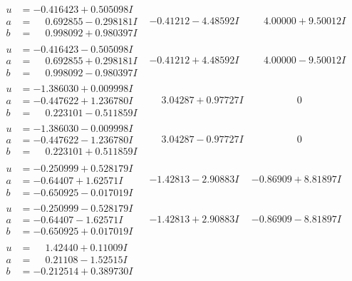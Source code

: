 \documentclass[1p]{elsarticle_modified}
\theoremstyle{definition}
\begin{document}
$$\begin{array}{c|c|c}
 \hline 
\begin{aligned}
u &= -0.416423 + 0.505098 I \\
a &= \phantom{-}0.692855 - 0.298181 I \\
b &= \phantom{-}0.998092 + 0.980397 I\end{aligned}
 & -0.41212 - 4.48592 I & \phantom{-}4.00000 + 9.50012 I \\ \hline\begin{aligned}
u &= -0.416423 - 0.505098 I \\
a &= \phantom{-}0.692855 + 0.298181 I \\
b &= \phantom{-}0.998092 - 0.980397 I\end{aligned}
 & -0.41212 + 4.48592 I & \phantom{-}4.00000 - 9.50012 I \\ \hline\begin{aligned}
u &= -1.386030 + 0.009998 I \\
a &= -0.447622 + 1.236780 I \\
b &= \phantom{-}0.223101 - 0.511859 I\end{aligned}
 & \phantom{-}3.04287 + 0.97727 I & \phantom{-0.000000 } 0 \\ \hline\begin{aligned}
u &= -1.386030 - 0.009998 I \\
a &= -0.447622 - 1.236780 I \\
b &= \phantom{-}0.223101 + 0.511859 I\end{aligned}
 & \phantom{-}3.04287 - 0.97727 I & \phantom{-0.000000 } 0 \\ \hline\begin{aligned}
u &= -0.250999 + 0.528179 I \\
a &= -0.64407 + 1.62571 I \\
b &= -0.650925 - 0.017019 I\end{aligned}
 & -1.42813 - 2.90883 I & -0.86909 + 8.81897 I \\ \hline\begin{aligned}
u &= -0.250999 - 0.528179 I \\
a &= -0.64407 - 1.62571 I \\
b &= -0.650925 + 0.017019 I\end{aligned}
 & -1.42813 + 2.90883 I & -0.86909 - 8.81897 I \\ \hline\begin{aligned}
u &= \phantom{-}1.42440 + 0.11009 I \\
a &= \phantom{-}0.21108 - 1.52515 I \\
b &= -0.212514 + 0.389730 I\end{aligned}

\end{array}$$
\end{document}
